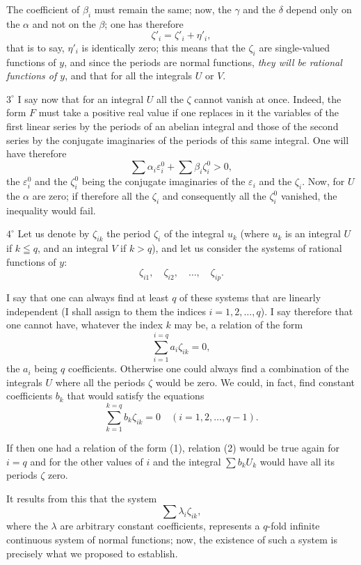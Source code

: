 \documentclass{article}
\begin{document}
The coefficient of $\beta_{i}$ must remain the same; now, the $\gamma$ and the $\delta$ depend only on the $\alpha$ and not on the $\beta$; one has therefore
\[
\zeta'_{i} = \zeta'_{i} + \eta'_{i},
\]
that is to say, $\eta'_{i}$ is identically zero; this means that the $\zeta_{i}$ are single-valued functions of $y$, and since the periods are normal functions, \emph{they will be rational functions of $y$}, and that for all the integrals $U$ or $V$.

$3^\circ$ I say now that for an integral $U$ all the $\zeta$ cannot vanish at once. Indeed, the form $F$ must take a positive real value if one replaces in it the variables of the first linear series by the periods of an abelian integral and those of the second series by the conjugate imaginaries of the periods of this same integral. One will have therefore
\[
\sum \alpha_{i} \varepsilon_{i}^{0} + \sum \beta_{i} \zeta_{i}^{0} > 0,
\]
the $\varepsilon_{i}^{0}$ and the $\zeta_{i}^{0}$ being the conjugate imaginaries of the $\varepsilon_{i}$ and the $\zeta_{i}$. Now, for $U$ the $\alpha$ are zero; if therefore all the $\zeta_{i}$ and consequently all the $\zeta_{i}^{0}$ vanished, the inequality would fail.

$4^\circ$ Let us denote by $\zeta_{ik}$ the period $\zeta_{i}$ of the integral $u_{k}$ (where $u_{k}$ is an integral $U$ if $k \leqq q$, and an integral $V$ if $k > q$), and let us consider the systems of rational functions of $y$:
\[
\zeta_{i1}, \quad \zeta_{i2}, \quad \ldots, \quad \zeta_{ip}.
\]

I say that one can always find at least $q$ of these systems that are linearly independent (I shall assign to them the indices $i = 1, 2, \ldots, q$). I say therefore that one cannot have, whatever the index $k$ may be, a relation of the form
\[
\sum_{i=1}^{i=q} a_{i} \zeta_{ik} = 0, \tag{1}
\]
the $a_{i}$ being $q$ coefficients. Otherwise one could always find a combination of the integrals $U$ where all the periods $\zeta$ would be zero. We could, in fact, find constant coefficients $b_{k}$ that would satisfy the equations
\[
\sum_{k=1}^{k=q} b_{k} \zeta_{ik} = 0 \quad (i = 1, 2, \ldots, q - 1). \tag{2}
\]

If then one had a relation of the form (1), relation (2) would be true again for $i = q$ and for the other values of $i$ and the integral $\displaystyle\sum b_{k} U_{k}$ would have all its periods $\zeta$ zero.

It results from this that the system
\[
\sum \lambda_{i} \zeta_{ik},
\]
where the $\lambda$ are arbitrary constant coefficients, represents a $q$-fold infinite continuous system of normal functions; now, the existence of such a system is precisely what we proposed to establish.
\end{document}
